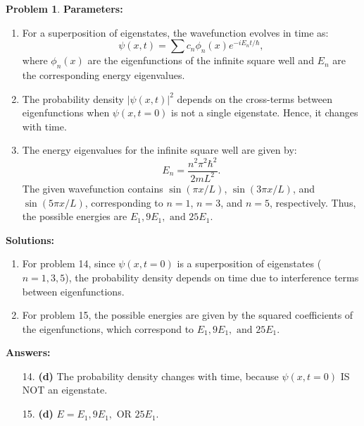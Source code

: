 \documentclass[12pt]{article}
\theoremstyle{definition} %
\newtheorem{problem}{Problem}
\theoremstyle{plain} %
\begin{document}
\begin{problem}
\textbf{Parameters:}
\begin{enumerate}
    \item For a superposition of eigenstates, the wavefunction evolves in time as:
    $$
    \psi(x, t) = \sum c_n \phi_n(x) e^{-i E_n t / \hbar},
    $$
    where \(\phi_n(x)\) are the eigenfunctions of the infinite square well and \(E_n\) are the corresponding energy eigenvalues.
    \item The probability density \(|\psi(x, t)|^2\) depends on the cross-terms between eigenfunctions when \(\psi(x, t=0)\) is not a single eigenstate. Hence, it changes with time.
    \item The energy eigenvalues for the infinite square well are given by:
    $$
    E_n = \frac{n^2 \pi^2 \hbar^2}{2mL^2}.
    $$
    The given wavefunction contains \(\sin(\pi x / L)\), \(\sin(3\pi x / L)\), and \(\sin(5\pi x / L)\), corresponding to \(n=1\), \(n=3\), and \(n=5\), respectively. Thus, the possible energies are \(E_1, 9E_1, \text{ and } 25E_1\).
\end{enumerate}

\textbf{Solutions:}
\begin{enumerate}
    \item For problem 14, since \(\psi(x, t=0)\) is a superposition of eigenstates (\(n=1, 3, 5\)), the probability density depends on time due to interference terms between eigenfunctions.
    \item For problem 15, the possible energies are given by the squared coefficients of the eigenfunctions, which correspond to \(E_1, 9E_1, \text{ and } 25E_1\).
\end{enumerate}

\textbf{Answers:}
\begin{enumerate}
    \item[14.] \textbf{(d)} The probability density changes with time, because \(\psi(x, t=0)\) IS NOT an eigenstate.
    \item[15.] \textbf{(d)} \(E = E_1, 9E_1, \text{ OR } 25E_1\).
\end{enumerate}
\end{problem}
\end{document}
